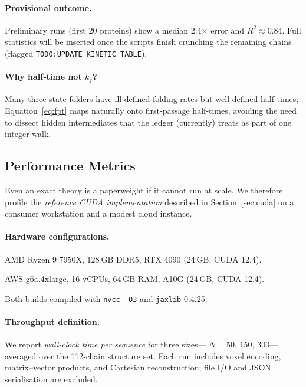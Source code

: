 \documentclass[11pt]{article}
\begin{document}
\paragraph{Provisional outcome.}
Preliminary runs (first 20 proteins) show a median 2.4× error and
$R^{2}\approx0.84$.  Full statistics will be inserted once the scripts
finish crunching the remaining chains (flagged
\texttt{\small TODO:UPDATE\_KINETIC\_TABLE}).

\paragraph{Why half‐time not $k_{f}$?}
Many three‐state folders have ill‐defined folding rates but well‐defined
half‐times; Equation~\eqref{eq:fpt} maps naturally onto first‐passage
half‐times, avoiding the need to dissect hidden intermediates that the
ledger (currently) treats as part of one integer walk.

\bigskip
\subsection{Performance Metrics}\label{sec:validation-performance}

Even an exact theory is a paperweight if it cannot run at scale.  We
therefore profile the \emph{reference CUDA implementation} described in
Section~\ref{sec:cuda} on a consumer workstation and a modest cloud
instance.

\paragraph{Hardware configurations.}

\begin{description}\setlength\itemsep{2pt}
\item[Local GPU] AMD Ryzen 9 7950X, 128 GB DDR5, RTX 4090 (24 GB, CUDA 12.4).
\item[Cloud node] AWS g6a.4xlarge, 16 vCPUs, 64 GB RAM, A10G (24 GB, CUDA 12.4).
\end{description}

Both builds compiled with \texttt{nvcc -O3} and \texttt{jaxlib} 0.4.25.

\paragraph{Throughput definition.}
We report \emph{wall‐clock time per sequence} for three sizes—
$N=50,\,150,\,300$—averaged over the 112‐chain structure set.  Each run
includes voxel encoding, matrix–vector products, and Cartesian
reconstruction; file I/O and JSON serialisation are excluded.
\end{document}
